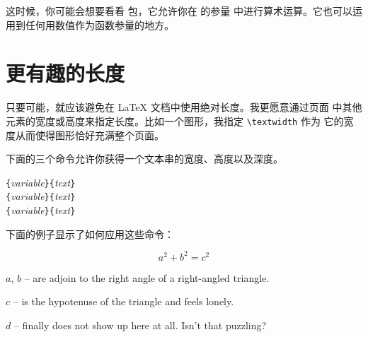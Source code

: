 这时候，你可能会想要看看  包，它允许你在  的参量
中进行算术运算。它也可以运用到任何用数值作为函数参量的地方。


\section{更有趣的长度}

只要可能，就应该避免在 \LaTeX{} 文档中使用绝对长度。我更愿意通过页面
中其他元素的宽度或高度来指定长度。比如一个图形，我指定 \verb|\textwidth| 作为
它的宽度从而使得图形恰好充满整个页面。

下面的三个命令允许你获得一个文本串的宽度、高度以及深度。

\begin{lscommand}
\verb|{|\emph{variable}\verb|}{|\emph{text}\verb|}|\\
\verb|{|\emph{variable}\verb|}{|\emph{text}\verb|}|\\
\verb|{|\emph{variable}\verb|}{|\emph{text}\verb|}|
\end{lscommand}

\noindent 下面的例子显示了如何应用这些命令：
\begin{example}
\flushleft
\newenvironment{vardesc}[1]{%
  \settowidth{\parindent}{#1:\ }
  \makebox[0pt][r]{#1:\ }}{}

\begin{displaymath}
a^2+b^2=c^2
\end{displaymath}

\begin{vardesc}{Where}$a$,
$b$ -- are adjoin to the right
angle of a right-angled triangle.

$c$ -- is the hypotenuse of
the triangle and feels lonely.

$d$ -- finally does not show up
here at all. Isn't that puzzling?
\end{vardesc}
\end{example}



